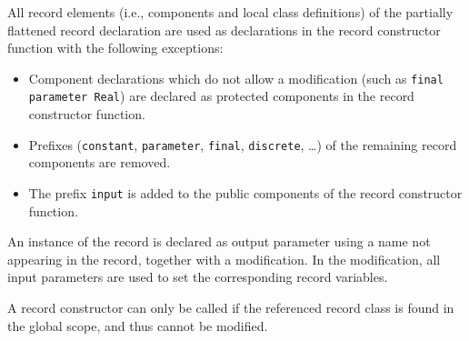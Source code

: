 All record elements (i.e., components and local class
definitions) of the partially flattened record declaration are used
as declarations in the record constructor function with the following
exceptions:
\begin{itemize}
\item
  Component declarations which do not allow a modification (such
  as \lstinline!final parameter Real!) are declared
  as protected components in the record constructor function.
\item
  Prefixes (\lstinline!constant!, \lstinline!parameter!, \lstinline!final!, \lstinline!discrete!, \ldots) of the remaining
  record components are removed.
\item
  The prefix \lstinline!input! is added to the public components of the record
  constructor function.
\end{itemize}

An instance of the record is declared as output parameter using
a name not appearing in the record, together with a modification. In
the modification, all input parameters are used to set the corresponding
record variables.

A record constructor can only be called if the referenced record class
is found in the global scope, and thus cannot be modified.

